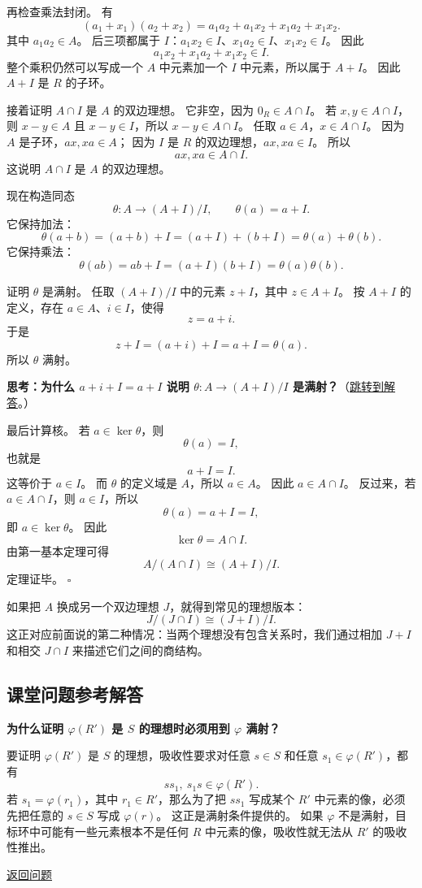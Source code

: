 再检查乘法封闭。
有
\[
(a_1+x_1)(a_2+x_2)
=a_1a_2+a_1x_2+x_1a_2+x_1x_2.
\]
其中 $a_1a_2\in A$。
后三项都属于 $I$：$a_1x_2\in I$、$x_1a_2\in I$、$x_1x_2\in I$。
因此
\[
a_1x_2+x_1a_2+x_1x_2\in I.
\]
整个乘积仍然可以写成一个 $A$ 中元素加一个 $I$ 中元素，所以属于 $A+I$。
因此 $A+I$ 是 $R$ 的子环。

接着证明 $A\cap I$ 是 $A$ 的双边理想。
它非空，因为 $0_R\in A\cap I$。
若 $x,y\in A\cap I$，则 $x-y\in A$ 且 $x-y\in I$，所以 $x-y\in A\cap I$。
任取 $a\in A$，$x\in A\cap I$。
因为 $A$ 是子环，$ax,xa\in A$；
因为 $I$ 是 $R$ 的双边理想，$ax,xa\in I$。
所以
\[
ax,xa\in A\cap I.
\]
这说明 $A\cap I$ 是 $A$ 的双边理想。

现在构造同态
\[
\theta:A\to (A+I)/I,\qquad \theta(a)=a+I.
\]
它保持加法：
\[
\theta(a+b)=(a+b)+I=(a+I)+(b+I)=\theta(a)+\theta(b).
\]
它保持乘法：
\[
\theta(ab)=ab+I=(a+I)(b+I)=\theta(a)\theta(b).
\]

证明 $\theta$ 是满射。
任取 $(A+I)/I$ 中的元素 $z+I$，其中 $z\in A+I$。
按 $A+I$ 的定义，存在 $a\in A$、$i\in I$，使得
\[
z=a+i.
\]
于是
\[
z+I=(a+i)+I=a+I=\theta(a).
\]
所以 $\theta$ 满射。

\hypertarget{q:second-iso-surjective}{}
\medskip
\noindent\textbf{思考：为什么 $a+i+I=a+I$ 说明 $\theta:A\to(A+I)/I$ 是满射？}（\hyperlink{ans:second-iso-surjective}{跳转到解答}。）
\medskip

最后计算核。
若 $a\in\ker\theta$，则
\[
\theta(a)=I,
\]
也就是
\[
a+I=I.
\]
这等价于 $a\in I$。
而 $\theta$ 的定义域是 $A$，所以 $a\in A$。
因此 $a\in A\cap I$。
反过来，若 $a\in A\cap I$，则 $a\in I$，所以
\[
\theta(a)=a+I=I,
\]
即 $a\in\ker\theta$。
因此
\[
\ker\theta=A\cap I.
\]
由第一基本定理可得
\[
A/(A\cap I)\cong (A+I)/I.
\]
定理证毕。 $\square$

如果把 $A$ 换成另一个双边理想 $J$，就得到常见的理想版本：
\[
J/(J\cap I)\cong (J+I)/I.
\]
这正对应前面说的第二种情况：当两个理想没有包含关系时，我们通过相加 $J+I$ 和相交 $J\cap I$ 来描述它们之间的商结构。

\subsection*{课堂问题参考解答}

\begin{exercise}\label{ex:ans-ideal-correspondence-surjective}
\hypertarget{ans:ideal-correspondence-surjective}{}
\textbf{为什么证明 $\varphi(R')$ 是 $S$ 的理想时必须用到 $\varphi$ 满射？}

要证明 $\varphi(R')$ 是 $S$ 的理想，吸收性要求对任意 $s\in S$ 和任意 $s_1\in\varphi(R')$，都有
\[
ss_1,\ s_1s\in\varphi(R').
\]
若 $s_1=\varphi(r_1)$，其中 $r_1\in R'$，那么为了把 $ss_1$ 写成某个 $R'$ 中元素的像，必须先把任意的 $s\in S$ 写成 $\varphi(r)$。
这正是满射条件提供的。
如果 $\varphi$ 不是满射，目标环中可能有一些元素根本不是任何 $R$ 中元素的像，吸收性就无法从 $R'$ 的吸收性推出。

\hyperlink{q:ideal-correspondence-surjective}{返回问题}
\end{exercise}

